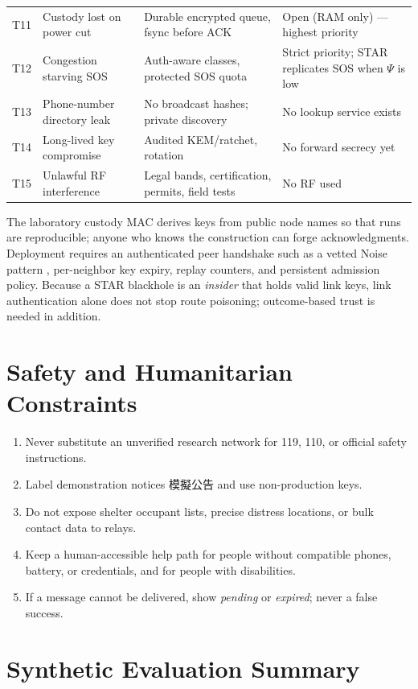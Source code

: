 \documentclass[jou,a4paper,11pt,floatsintext]{apa7}
\begin{document}
\begin{table}[t]
\begin{tabularx}{\textwidth}{@{}lp{3.6cm}YY@{}}
T11 & Custody lost on power cut & Durable encrypted queue, fsync before ACK & Open (RAM only) --- highest priority \\
T12 & Congestion starving SOS & Auth-aware classes, protected SOS quota & Strict priority; STAR replicates SOS when $\Psi$ is low \\
T13 & Phone-number directory leak & No broadcast hashes; private discovery & No lookup service exists \\
T14 & Long-lived key compromise & Audited KEM/ratchet, rotation & No forward secrecy yet \\
T15 & Unlawful RF interference & Legal bands, certification, permits, field tests & No RF used \\
\bottomrule
\end{tabularx}
\end{table}

The laboratory custody MAC derives keys from public node names so that runs are reproducible; anyone who knows the construction can forge acknowledgments. Deployment requires an authenticated peer handshake such as a vetted Noise pattern \parencite{perrin2018}, per-neighbor key expiry, replay counters, and persistent admission policy. Because a STAR blackhole is an \emph{insider} that holds valid link keys, link authentication alone does not stop route poisoning; outcome-based trust is needed in addition.

\section{Safety and Humanitarian Constraints}
\begin{enumerate}
\item Never substitute an unverified research network for 119, 110, or official safety instructions.
\item Label demonstration notices 模擬公告 and use non-production keys.
\item Do not expose shelter occupant lists, precise distress locations, or bulk contact data to relays.
\item Keep a human-accessible help path for people without compatible phones, battery, or credentials, and for people with disabilities.
\item If a message cannot be delivered, show \emph{pending} or \emph{expired}; never a false success.
\end{enumerate}

\section{Synthetic Evaluation Summary}
\label{sec:eval}
\end{document}
